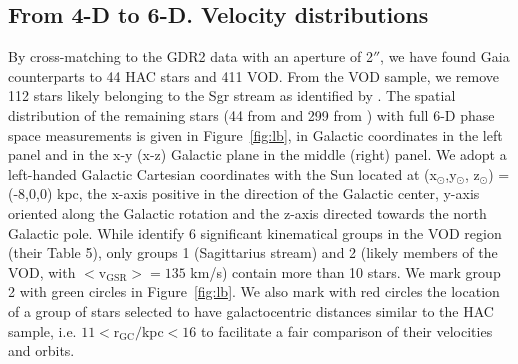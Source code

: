 \documentclass[fleqn,usenatbib]{mnras}
\begin{document}
%
\subsection{From 4-D to 6-D. Velocity distributions}

By cross-matching to the GDR2 data with an aperture of 2$''$, we have
found Gaia counterparts to 44 HAC stars and 411 VOD. From the VOD
sample, we remove 112 stars likely belonging to the Sgr stream as
identified by \citep[][, their group 1]{Vivas2016}. The spatial
distribution of the remaining stars (44 from \citealt{Simion2018} and
299 from \citealt{Vivas2016}) with full 6-D phase space measurements
is given in Figure~\ref{fig:lb}, in Galactic coordinates in the left
panel and in the x-y (x-z) Galactic plane in the middle (right)
panel. We adopt a left-handed Galactic Cartesian coordinates with the
Sun located at (x$_{\odot}$,y$_{\odot}$, z$_{\odot}$) = (-8,0,0) kpc,
the x-axis positive in the direction of the Galactic center, y-axis
oriented along the Galactic rotation and the z-axis directed towards
the north Galactic pole. While \citealt{Vivas2016} identify 6
significant kinematical groups in the VOD region (their Table 5), only
groups 1 (Sagittarius stream) and 2 (likely members of the VOD, with
$\mathrm{<v_{GSR}>}= 135$ km/s) contain more than 10 stars. We mark
group 2 with green circles in Figure~\ref{fig:lb}. We also mark with
red circles the location of a group of stars selected to have
galactocentric distances similar to the HAC sample, i.e.
$11\mathrm{<r_{GC}}/$kpc$<16$ to facilitate a fair comparison of their
velocities and orbits.
\end{document}
